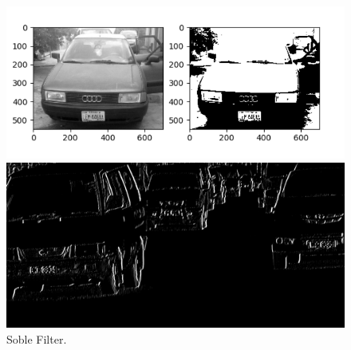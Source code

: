 \documentclass[letterpaper,12pt]{article}
\begin{document}
\begin{figure}
	\centering
	\begin{minipage}[b]{.4\textwidth}
		\centering \includegraphics[width=0.8\columnwidth]{gray_binary.png}
		
		\caption{
			\label{fig:5} %
			Gray Scale \$ Binary image.
		}
		
	\end{minipage}\qquad
	\begin{minipage}[b]{.4\textwidth}
		
		\centering \includegraphics[width=0.8\columnwidth]{soble.png}
		
		\caption{
			\label{fig:6} %
			Soble Filter.
		}
		
	\end{minipage}
\end{figure}
\end{document}
